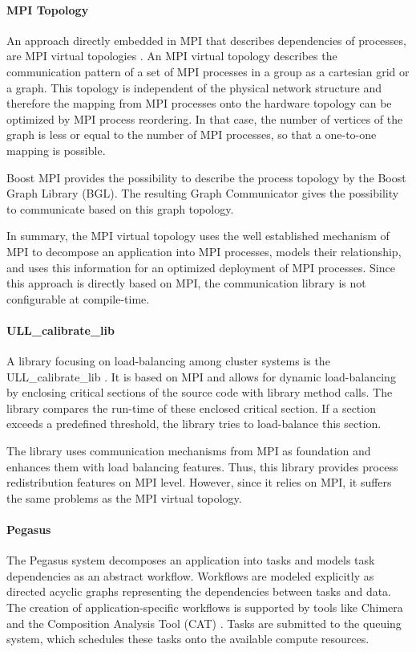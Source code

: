 \paragraph*{MPI Topology}
An approach directly embedded in MPI that describes dependencies of
processes, are MPI virtual topologies \cite{ref:mpi_topology}. An MPI
virtual topology describes the communication pattern of a set of MPI
processes in a group as a cartesian grid or a graph.  This topology is
independent of the physical network structure and therefore the
mapping from MPI processes onto the hardware topology can be optimized
by MPI process reordering. In that case, the number of vertices of the
graph is less or equal to the number of MPI processes, so that a
one-to-one mapping is possible.

Boost MPI provides the possibility to describe the process topology by
the Boost Graph Library (BGL)\cite{ref:boost_bgl}.  The resulting
Graph Communicator \cite{ref:boost_graph_communicator} gives the
possibility to communicate based on this graph topology.

In summary, the MPI virtual topology uses the well established
mechanism of MPI to decompose an application into MPI processes,
models their relationship, and uses this information for an optimized
deployment of MPI processes.  Since this approach is directly based on
MPI, the communication library is not configurable at compile-time.


\paragraph*{ULL\_calibrate\_lib}
A library focusing on load-balancing among cluster systems is the
ULL\_calibrate\_lib \cite{ref:ull_calibrate_lib}. It is based on MPI
and allows for dynamic load-balancing by enclosing critical sections
of the source code with library method calls. The library compares the
run-time of these enclosed critical section. If a section exceeds a
predefined threshold, the library tries to load-balance this section.

The library uses communication mechanisms from MPI as foundation and
enhances them with load balancing features. Thus, this library
provides process redistribution features on MPI level. However, since
it relies on MPI, it suffers the same problems as the MPI virtual
topology.

\paragraph*{Pegasus}
The Pegasus system \cite{ref:pegasus} decomposes an application into
tasks and models task dependencies as an abstract workflow. Workflows
are modeled explicitly as directed acyclic graphs representing the
dependencies between tasks and data. The creation of
application-specific workflows is supported by tools like Chimera
\cite{ref:chimera} and the Composition Analysis Tool (CAT)
\cite{ref:cat}.  Tasks are submitted to the queuing system, which
schedules these tasks onto the available compute resources.

